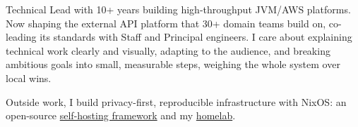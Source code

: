 
\begin{cvparagraph}
    Technical Lead with 10+ years building high-throughput JVM/AWS platforms. Now shaping the external API platform that 30+ domain teams build on, co-leading its standards with Staff and Principal engineers. I care about explaining technical work clearly and visually, adapting to the audience, and breaking ambitious goals into small, measurable steps, weighing the whole system over local wins.

    Outside work, I build privacy-first, reproducible infrastructure with NixOS: an open-source \href{https://github.com/bphenriques/selfhost-nix}{self-hosting framework} and my \href{https://github.com/bphenriques/dotfiles}{homelab}.
\end{cvparagraph}


